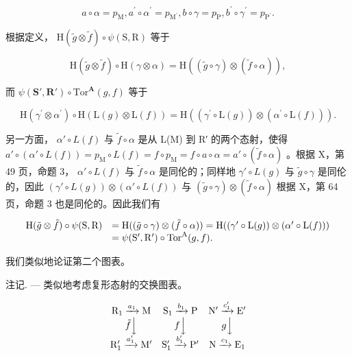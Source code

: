 \[
a \circ \alpha = p _ {\mathrm{M}}, a ^ {\prime} \circ \alpha^ {\prime} = p _ {\mathrm {M^ {\prime}}}, b \circ \gamma = p _ {\mathrm{P}}, b ^ {\prime} \circ \gamma^ {\prime} = p _ {\mathrm {P^ {\prime}}}.
\]

根据定义， \(\mathrm{H}(\tilde{g}\otimes\tilde{f})\circ\psi(\mathrm{S},\mathrm{R})\) 等于

\[
\mathrm{H} (\tilde {g} \otimes \tilde {f}) \circ \mathrm{H} (\gamma \otimes \alpha) = \mathrm{H} ((\tilde {g} \circ \gamma) \otimes (\tilde {f} \circ \alpha)),
\]

而 \(\psi(\mathbf{S}',\mathbf{R}')\circ\mathrm{Tor}^{\mathbf{A}}(g,f)\) 等于

\[
\mathrm{H} \left(\gamma^ {\prime} \otimes \alpha^ {\prime}\right) \circ \mathrm{H} \left(\mathrm{L} (g) \otimes \mathrm{L} (f)\right) = \mathrm{H} \left(\left(\gamma^ {\prime} \circ \mathrm{L} (g)\right) \otimes \left(\alpha^ {\prime} \circ \mathrm{L} (f)\right)\right).
\]

另一方面， \(\alpha' \circ L(f)\) 与 \(\tilde{f} \circ \alpha\) 是从 L(M) 到 R′ 的两个态射，使得 \(a' \circ (\alpha' \circ L(f)) = p_{\mathrm{M}} \circ L(f) = f \circ p_{\mathrm{M}} = f \circ a \circ \alpha = a' \circ (\tilde{f} \circ \alpha)\) 。根据 X，第 49 页，命题 3， \(\alpha' \circ L(f)\) 与 \(\tilde{f} \circ \alpha\) 是同伦的；同样地 \(\gamma' \circ L(g)\) 与 \(\tilde{g} \circ \gamma\) 是同伦的，因此 \((\gamma' \circ L(g)) \otimes (\alpha' \circ L(f))\) 与 \((\tilde{g} \circ \gamma) \otimes (\tilde{f} \circ \alpha)\) 根据 X，第 64 页，命题 3 也是同伦的。因此我们有

\[
\begin{array}{r l} \mathrm{H} (\tilde {g} \otimes \tilde {f}) \circ \psi (\mathrm{S}, \mathrm{R}) & = \mathrm{H} ((\tilde {g} \circ \gamma) \otimes (\tilde {f} \circ \alpha)) = \mathrm{H} ((\gamma^ {\prime} \circ \mathrm{L} (g)) \otimes (\alpha^ {\prime} \circ \mathrm{L} (f))) \\ & = \psi (\mathrm{S} ^ {\prime}, \mathrm{R} ^ {\prime}) \circ \mathrm{Tor} ^ {\mathrm{A}} (g, f). \end{array}
\]

我们类似地论证第二个图表。

注记. --- 类似地考虑复形态射的交换图表。

\[
\begin{array}{c c c} \mathrm{R} _ {1} \xrightarrow {a _ {1}} \mathrm{M} & \mathrm{S} _ {1} \xrightarrow {b _ {1}} \mathrm{P} & \mathrm{N} ^ {\prime} \xrightarrow {c _ {1} ^ {\prime}} \mathrm{E} ^ {\prime} \\ \tilde {f} \Big \downarrow & f \Big \downarrow & g \Big \downarrow \\ \mathrm{R} _ {1} ^ {\prime} \xrightarrow {a _ {1} ^ {\prime}} \mathrm{M} ^ {\prime} & \mathrm{S} _ {1} ^ {\prime} \xrightarrow {b _ {1} ^ {\prime}} \mathrm{P} ^ {\prime} & \mathrm{N} \xrightarrow {c _ {1}} \mathrm{E} _ {1} \end{array}
\]

